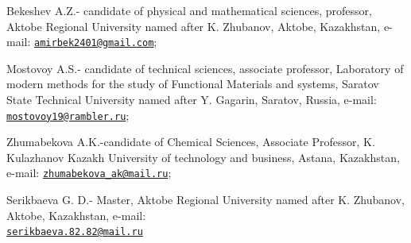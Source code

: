 \begin{authorinfo}
Bekeshev A.Z.- candidate of physical and mathematical sciences,
professor, Aktobe Regional University named after K. Zhubanov, Aktobe,
Kazakhstan, e-mail:
\href{mailto:amirbek2401@gmail.com}{\nolinkurl{amirbek2401@gmail.com}};

Mostovoy A.S.- candidate of technical sciences, associate professor,
Laboratory of modern methods for the study of Functional Materials and
systems, Saratov State Technical University named after Y. Gagarin,
Saratov, Russia, e-mail:
\\\href{mailto:mostovoy19@rambler.ru}{\nolinkurl{mostovoy19@rambler.ru}};

Zhumabekova A.K.-candidate of Chemical Sciences, Associate Professor, K.
Kulazhanov Kazakh University of technology and business, Astana,
Kazakhstan, e-mail:
\href{mailto:zhumabekova_ak@mail.ru}{\nolinkurl{zhumabekova\_ak@mail.ru}};

Serikbaeva G. D.- Master, Aktobe Regional University named after K.
Zhubanov, Aktobe, Kazakhstan, e-mail:
\\\href{mailto:serikbaeva.82.82@mail.ru}{\nolinkurl{serikbaeva.82.82@mail.ru}}
\end{authorinfo}

